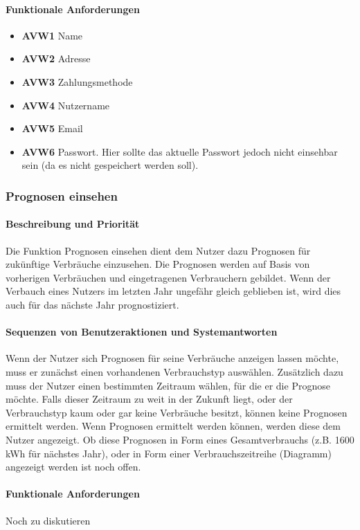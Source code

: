\paragraph{Funktionale Anforderungen}
\begin{itemize}
	\item \textbf{AVW1} Name
	\item \textbf{AVW2} Adresse
	\item \textbf{AVW3} Zahlungsmethode
	\item \textbf{AVW4} Nutzername
	\item \textbf{AVW5} Email
	\item \textbf{AVW6} Passwort. Hier sollte das aktuelle Passwort jedoch nicht einsehbar sein (da es nicht gespeichert werden soll).
\end{itemize}
\subsubsection{Prognosen einsehen}
\paragraph{Beschreibung und Priorität}
Die Funktion Prognosen einsehen dient dem Nutzer dazu Prognosen für zukünftige Verbräuche einzusehen. Die Prognosen werden auf Basis von vorherigen Verbräuchen und eingetragenen Verbrauchern gebildet. Wenn der Verbauch eines Nutzers im letzten Jahr ungefähr gleich geblieben ist, wird dies auch für das nächste Jahr prognostiziert.
\paragraph{Sequenzen von Benutzeraktionen und Systemantworten}
Wenn der Nutzer sich Prognosen für seine Verbräuche anzeigen lassen möchte, muss er zunächst einen vorhandenen Verbrauchstyp auswählen. Zusätzlich dazu muss der Nutzer einen bestimmten Zeitraum wählen, für die er die Prognose möchte. Falls dieser Zeitraum zu weit in der Zukunft liegt, oder der Verbrauchstyp kaum oder gar keine Verbräuche besitzt, können keine Prognosen ermittelt werden. Wenn Prognosen ermittelt werden können, werden diese dem Nutzer angezeigt. Ob diese Prognosen in Form eines Gesamtverbrauchs (z.B. 1600 kWh für nächstes Jahr), oder in Form einer Verbrauchszeitreihe (Diagramm) angezeigt werden ist noch offen.
\paragraph{Funktionale Anforderungen}
Noch zu diskutieren

